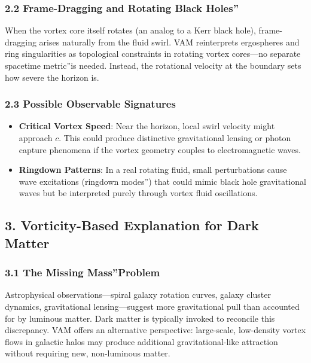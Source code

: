 \subsubsection*{2.2 Frame-Dragging and Rotating \grqq Black Holes\textquotedblright}
When the vortex core itself rotates (an analog to a Kerr black hole), frame-dragging arises naturally from the fluid swirl. VAM reinterprets ergospheres and ring singularities as topological constraints in rotating vortex cores—no separate \grqq spacetime metric\textquotedblright is needed. Instead, the rotational velocity at the boundary sets how severe the horizon is.

\subsubsection*{2.3 Possible Observable Signatures}
\begin{itemize}
    \item \textbf{Critical Vortex Speed}: Near the horizon, local swirl velocity might approach \(c\). This could produce distinctive gravitational lensing or photon capture phenomena if the vortex geometry couples to electromagnetic waves.
    \item \textbf{Ringdown Patterns}: In a real rotating fluid, small perturbations cause wave excitations (\grqq ringdown modes\textquotedblright) that could mimic black hole gravitational waves but be interpreted purely through vortex fluid oscillations.
\end{itemize}

\subsection*{3. Vorticity-Based Explanation for Dark Matter}

\subsubsection*{3.1 The \grqq Missing Mass\textquotedblright Problem}
Astrophysical observations—spiral galaxy rotation curves, galaxy cluster dynamics, gravitational lensing—suggest more gravitational pull than accounted for by luminous matter. Dark matter is typically invoked to reconcile this discrepancy. VAM offers an alternative perspective: large-scale, low-density vortex flows in galactic halos may produce additional gravitational-like attraction without requiring new, non-luminous matter.

